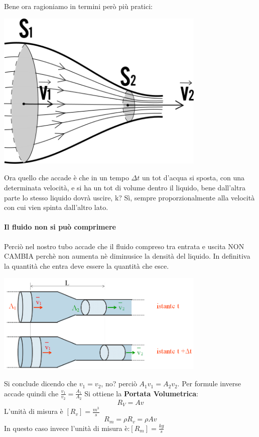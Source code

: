 \documentclass[12pt, a4paper, openany, oneside]{book}
\begin{document}
Bene ora ragioniamo in termini però più pratici: 
\begin{center}
\includegraphics[width=0.75\textwidth]{10}
\end{center}		 
Ora quello che accade è che in un tempo $\Delta t$ un tot d'acqua si sposta, 
con una determinata velocità, e si ha un tot di volume dentro il liquido, bene
dall'altra parte lo stesso liquido dovrà uscire, k? Sì, sempre proporzionalmente
alla velocità con cui vien spinta dall'altro lato. 
\paragraph{Il fluido non si può comprimere} Perciò nel nostro tubo accade che il 
fluido compreso tra entrata e uscita NON CAMBIA perchè non aumenta nè diminusice
la densità del liquido. In definitiva la quantità che entra deve essere la 
quantità che esce.
\begin{center}
\includegraphics[width=0.75\textwidth]{11}
\end{center}
Si conclude dicendo che $v_{1} = v_{2}$, no? perciò $A_{1}v_{1} = A_{2}v_{2}$.
Per formule inverse accade quindi che $\frac{v_1}{v_2} = \frac{A_1}{A_2}$
Si ottiene la \textbf{Portata Volumetrica}:
\[
R_{V} = Av	
\]
L'unità di misura è $[R_{v}] = \frac{m^{3}}{s}$
\[
R_{m} = \rho R_{v} = \rho Av
\]
In questo caso invece l'unità di misura è:$[R_{m}] = \frac{kg}{s}$
\end{document}
